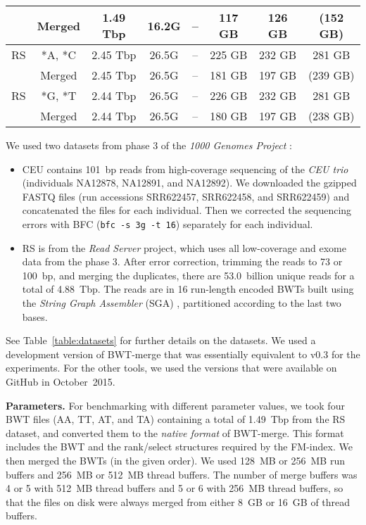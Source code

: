 \documentclass[smallabstract,smallcaptions]{dccpaper}
\newcommand{\BWT}{\textsf{BWT}}
\newcommand{\rank}{\textsf{rank}}
\newcommand{\select}{\textsf{select}}
\newcommand{\BWTmerge}{\textsf{BWT\nobreakdash-merge}}
\newcommand{\CEU}{\textsf{CEU}}
\newcommand{\RS}{\textsf{RS}}
\begin{document}
\begin{table}[t!]
\begin{center}
{\begin{tabular}{cc|cc|cc|cc}
     & Merged  & 1.49 Tbp & 16.2G &      -- &  117 GB &  126 GB & (152 GB) \\
\hline
\RS  & *A, *C  & 2.45 Tbp & 26.5G &      -- &  225 GB &  232 GB &   281 GB \\
     & Merged  & 2.45 Tbp & 26.5G &      -- &  181 GB &  197 GB & (239 GB) \\
\hline
\RS  & *G, *T  & 2.44 Tbp & 26.5G &      -- &  226 GB &  232 GB &   281 GB \\
     & Merged  & 2.44 Tbp & 26.5G &      -- &  180 GB &  197 GB & (238 GB) \\
\hline
\end{tabular}}
\end{center}
\end{table}

We used two datasets from phase 3 of the \emph{1000 Genomes Project} \cite{1000GP2015}:
\begin{itemize}

\item \CEU{} contains 101~bp reads from high-coverage sequencing of the \emph{CEU trio} (individuals NA12878, NA12891, and NA12892). We downloaded the gzipped FASTQ files (run accessions SRR622457, SRR622458, and SRR622459) and concatenated the files for each individual. Then we corrected the sequencing errors with BFC \cite{Li2015} (\texttt{bfc -s 3g -t 16}) separately for each individual.

\item \RS{} is from the \emph{Read Server} project, which uses all low-coverage and exome data from the phase 3. After error correction, trimming the reads to 73 or 100~bp, and merging the duplicates, there are 53.0~billion unique reads for a total of 4.88~Tbp. The reads are in 16 run-length encoded \BWT{}s built using the \emph{String Graph Assembler} (SGA) \cite{Simpson2012}, partitioned according to the last two bases.

\end{itemize}
See Table~\ref{table:datasets} for further details on the datasets. We used a development version of \BWTmerge{} that was essentially equivalent to v0.3 for the experiments. For the other tools, we used the versions that were available on GitHub in October~2015.

\smallbreak\noindent\textbf{Parameters.} For benchmarking with different parameter values, we took four \BWT{} files (AA, TT, AT, and TA) containing a total of 1.49~Tbp from the \RS{} dataset, and converted them to the \emph{native format} of \BWTmerge. This format includes the \BWT{} and the \rank/\select{} structures required by the FM-index. We then merged the \BWT{}s (in the given order). We used 128~MB or 256~MB run buffers and 256~MB or 512~MB thread buffers. The number of merge buffers was 4 or 5 with 512~MB thread buffers and 5 or 6 with 256~MB thread buffers, so that the files on disk were always merged from either 8~GB or 16~GB of thread buffers.
\end{document}
